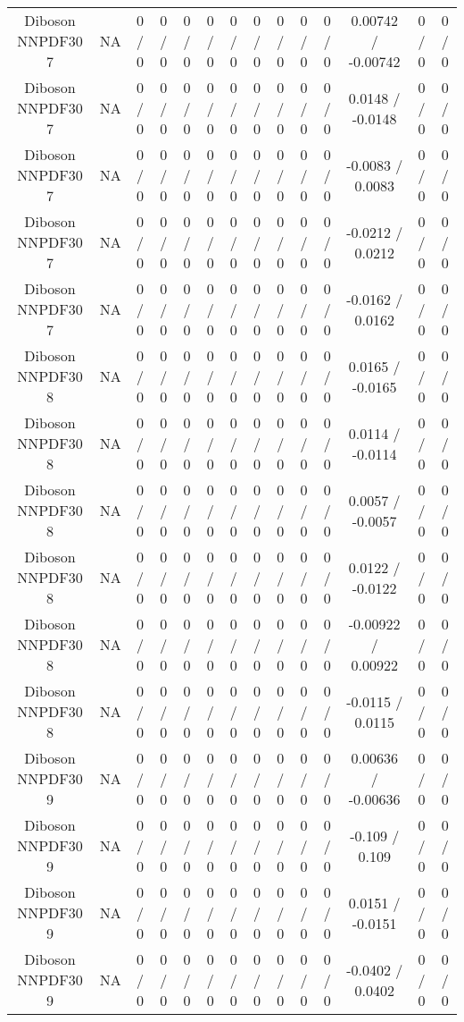 \documentclass[10pt]{article}
\begin{document}
\begin{table}[htbp]
\begin{center}
\begin{tabular}{|c|c|c|c|c|c|c|c|c|c|c|c|c|c|}
  Diboson NNPDF30 7 &    NA    & 0 / 0 & 0 / 0 & 0 / 0 & 0 / 0 & 0 / 0 & 0 / 0 & 0 / 0 & 0 / 0 & 0 / 0 & 0.00742 / -0.00742 & 0 / 0 & 0 / 0 \\ 
  Diboson NNPDF30 7 &    NA    & 0 / 0 & 0 / 0 & 0 / 0 & 0 / 0 & 0 / 0 & 0 / 0 & 0 / 0 & 0 / 0 & 0 / 0 & 0.0148 / -0.0148 & 0 / 0 & 0 / 0 \\ 
  Diboson NNPDF30 7 &    NA    & 0 / 0 & 0 / 0 & 0 / 0 & 0 / 0 & 0 / 0 & 0 / 0 & 0 / 0 & 0 / 0 & 0 / 0 & -0.0083 / 0.0083 & 0 / 0 & 0 / 0 \\ 
  Diboson NNPDF30 7 &    NA    & 0 / 0 & 0 / 0 & 0 / 0 & 0 / 0 & 0 / 0 & 0 / 0 & 0 / 0 & 0 / 0 & 0 / 0 & -0.0212 / 0.0212 & 0 / 0 & 0 / 0 \\ 
  Diboson NNPDF30 7 &    NA    & 0 / 0 & 0 / 0 & 0 / 0 & 0 / 0 & 0 / 0 & 0 / 0 & 0 / 0 & 0 / 0 & 0 / 0 & -0.0162 / 0.0162 & 0 / 0 & 0 / 0 \\ 
  Diboson NNPDF30 8 &    NA    & 0 / 0 & 0 / 0 & 0 / 0 & 0 / 0 & 0 / 0 & 0 / 0 & 0 / 0 & 0 / 0 & 0 / 0 & 0.0165 / -0.0165 & 0 / 0 & 0 / 0 \\ 
  Diboson NNPDF30 8 &    NA    & 0 / 0 & 0 / 0 & 0 / 0 & 0 / 0 & 0 / 0 & 0 / 0 & 0 / 0 & 0 / 0 & 0 / 0 & 0.0114 / -0.0114 & 0 / 0 & 0 / 0 \\ 
  Diboson NNPDF30 8 &    NA    & 0 / 0 & 0 / 0 & 0 / 0 & 0 / 0 & 0 / 0 & 0 / 0 & 0 / 0 & 0 / 0 & 0 / 0 & 0.0057 / -0.0057 & 0 / 0 & 0 / 0 \\ 
  Diboson NNPDF30 8 &    NA    & 0 / 0 & 0 / 0 & 0 / 0 & 0 / 0 & 0 / 0 & 0 / 0 & 0 / 0 & 0 / 0 & 0 / 0 & 0.0122 / -0.0122 & 0 / 0 & 0 / 0 \\ 
  Diboson NNPDF30 8 &    NA    & 0 / 0 & 0 / 0 & 0 / 0 & 0 / 0 & 0 / 0 & 0 / 0 & 0 / 0 & 0 / 0 & 0 / 0 & -0.00922 / 0.00922 & 0 / 0 & 0 / 0 \\ 
  Diboson NNPDF30 8 &    NA    & 0 / 0 & 0 / 0 & 0 / 0 & 0 / 0 & 0 / 0 & 0 / 0 & 0 / 0 & 0 / 0 & 0 / 0 & -0.0115 / 0.0115 & 0 / 0 & 0 / 0 \\ 
  Diboson NNPDF30 9 &    NA    & 0 / 0 & 0 / 0 & 0 / 0 & 0 / 0 & 0 / 0 & 0 / 0 & 0 / 0 & 0 / 0 & 0 / 0 & 0.00636 / -0.00636 & 0 / 0 & 0 / 0 \\ 
  Diboson NNPDF30 9 &    NA    & 0 / 0 & 0 / 0 & 0 / 0 & 0 / 0 & 0 / 0 & 0 / 0 & 0 / 0 & 0 / 0 & 0 / 0 & -0.109 / 0.109 & 0 / 0 & 0 / 0 \\ 
  Diboson NNPDF30 9 &    NA    & 0 / 0 & 0 / 0 & 0 / 0 & 0 / 0 & 0 / 0 & 0 / 0 & 0 / 0 & 0 / 0 & 0 / 0 & 0.0151 / -0.0151 & 0 / 0 & 0 / 0 \\ 
  Diboson NNPDF30 9 &    NA    & 0 / 0 & 0 / 0 & 0 / 0 & 0 / 0 & 0 / 0 & 0 / 0 & 0 / 0 & 0 / 0 & 0 / 0 & -0.0402 / 0.0402 & 0 / 0 & 0 / 0 \\ 

\end{tabular}
\end{center}
\end{table}
\end{document}
